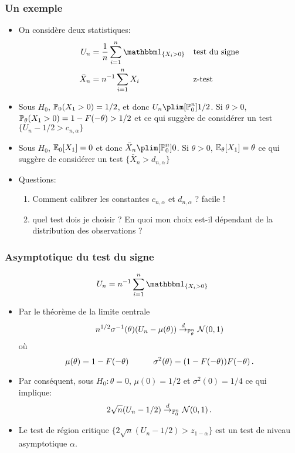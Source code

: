 \begin{frame}
\frametitle{Un exemple}
\begin{itemize}
\item On considère deux statistiques:
\begin{align*}
U_n&= \frac{1}{n} \sum_{i=1}^n \indi{X_i > 0} &&\text{test du signe} \\
\bar{X}_n&= n^{-1} \sum_{i=1}^n X_i     &&\text{z-test}
\end{align*}
\item  Sous $H_0$, $\operatorname{{\mathbb P}}_0( X_1 > 0)=1/2$, et donc $U_n \plim[\PP_{0}^n] 1/2$. Si $\theta > 0$, $\operatorname{{\mathbb P}}_\theta(X_1 > 0) =  1 - F(-\theta) > 1/2$ et
ce qui suggère de considérer un test $\{ U_n -1/2 > c_{n,\alpha} \}$
\item Sous $H_0$,  $\operatorname{{\mathbb E}}_0[X_1]= 0$ et donc $\bar{X}_n \plim[\PP_{0}^n] 0$. Si $\theta > 0$, $\operatorname{{\mathbb E}}_\theta[X_1]= \theta$ ce qui suggère de
considérer un test $\{ \bar{X}_n > d_{n,\alpha} \}$
\item \alert{Questions:}
\begin{enumerate}
\item Comment calibrer  les constantes $c_{n,\alpha}$  et $d_{n,\alpha}$ ? facile !
\item quel test dois je choisir ? En quoi mon choix est-il dépendant de la distribution des observations ?
\end{enumerate}
\end{itemize}
\end{frame}

\begin{frame}
\frametitle{Asymptotique du test du signe}
$$
U_n= n^{-1} \sum_{i=1}^n \indi{X_i > 0}
$$
\begin{itemize}
\item Par le théorème de la limite centrale
$$
n^{1/2} \sigma^{-1}(\theta) (U_n - \mu(\theta)) \stackrel{d}{\rightarrow}_{\operatorname{{\mathbb P}}^n_\theta} \mathcal{N}(0,1)
$$
où
\[
\mu(\theta) = 1 - F(-\theta) \quad \qquad \sigma^2(\theta) = (1-F(-\theta)) F(-\theta) \,.
\]
\item Par conséquent, sous $H_0: \theta = 0$, $\mu(0)=1/2$ et $\sigma^2(0)= 1/4$ ce qui implique:
\[
2 \sqrt{n} (U_n - 1/2) \stackrel{d}{\rightarrow}_{\operatorname{{\mathbb P}}^n_0} \mathcal{N}(0,1) \,.
\]
\item Le test de région critique  $\{ 2 \sqrt{n} (U_n -1/2) > z_{ 1-\alpha} \}$ est un test de niveau asymptotique $\alpha$.
\end{itemize}
\end{frame}

